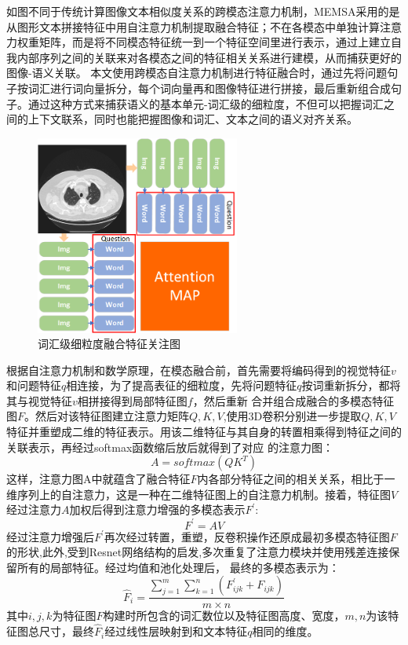 如图不同于传统计算图像文本相似度关系的跨模态注意力机制，MEMSA采用的是从图形文本拼接特征中用自注意力机制提取融合特征；不在各模态中单独计算注意力权重矩阵，而是将不同模态特征统一到一个特征空间里进行表示，通过上建立自我内部序列之间的关联来对各模态之间的特征相关关系进行建模，从而捕获更好的图像-语义关联。
本文使用跨模态自注意力机制进行特征融合时，通过先将问题句子按词汇进行词向量拆分，每个词向量再和图像特征进行拼接，最后重新组合成句子。通过这种方式来捕获语义的基本单元-词汇级的细粒度，不但可以把握词汇之间的上下文联系，同时也能把握图像和词汇、文本之间的语义对齐关系。
\begin{figure}[htbp]
	\centering	
	\includegraphics[width=0.6\textwidth]{Fig/myfig/chapter3/attention_map.png}  %
	\caption{\label{attention_map}词汇级细粒度融合特征关注图} 
\end{figure}

根据自注意力机制和数学原理，在模态融合前，首先需要将编码得到的视觉特征$v$和问题特征$q$相连接，为了提高表征的细粒度，先将问题特征$q$按词重新拆分，都将其与视觉特征$v$相拼接得到局部特征图$f$，然后重新
合并组合成融合的多模态特征图$F$。然后对该特征图建立注意力矩阵$Q,K,V$,使用3D卷积分别进一步提取$Q,K,V$特征并重塑成二维的特征表示。用该二维特征与其自身的转置相乘得到特征之间的关联表示，再经过softmax函数缩后放后就得到了对应
的注意力图：
\begin{equation}
	\label{}
	A = softmax(QK^{T})
\end{equation}
这样，注意力图A中就蕴含了融合特征$F$内各部分特征之间的相关关系，相比于一维序列上的自注意力，这是一种在二维特征图上的自注意力机制。接着，特征图$V$经过注意力$A$加权后得到注意力增强的多模态表示$F^{\prime}$:
\begin{equation}
	\label{}
	F^{\prime} = A V
\end{equation}
经过注意力增强后$F^{\prime}$再次经过转置，重塑，反卷积操作还原成最初多模态特征图$F$的形状,此外,受到Resnet网络结构的启发,多次重复了注意力模块并使用残差连接保留所有的局部特征。经过均值和池化处理后，
最终的多模态表示为：
\begin{equation}
	\label{}
	\hat{F}_i=\frac{\sum_{j=1}^m \sum_{k=1}^n\left(F_{i j k}^{\prime}+F_{i j k}\right)}{m \times n}
\end{equation}
其中$i,j,k$为特征图$F$构建时所包含的词汇数位以及特征图高度、宽度，$m,n$为该特征图总尺寸，最终$\hat{F}_i$经过线性层映射到和文本特征$q$相同的维度。

